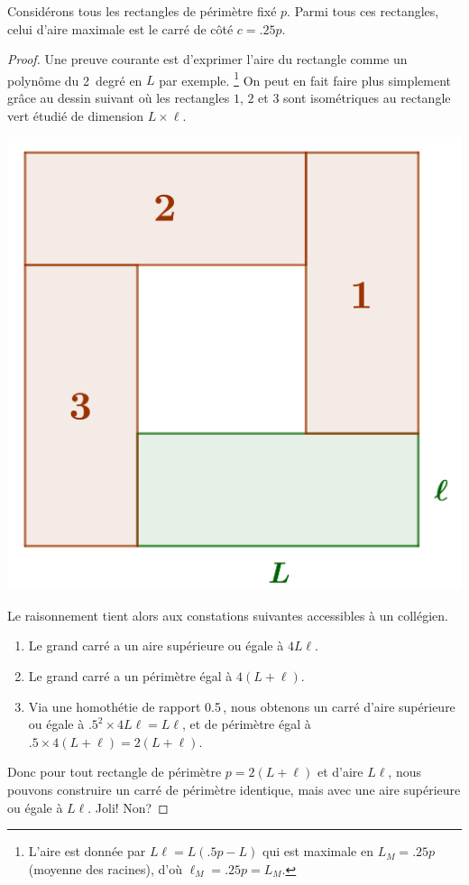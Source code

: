 \begin{fact} \label{iso-rect}
	Considérons tous les rectangles de périmètre fixé $p$. Parmi tous ces rectangles, celui d'aire maximale est le carré de côté $c = \num{.25} p$.
\end{fact}


\begin{proof}
	Une preuve courante est d'exprimer l'aire du rectangle comme un polynôme du 2\ieme\ degré en $L$ par exemple.%
	\footnote{
		L'aire est donnée par $L \ell = L (\num{.5} p - L)$ qui est maximale en $L_M = \num{.25} p$ (moyenne des racines), d'où $\ell_M = \num{.25} p = L_M$.
	}
	On peut en fait faire plus simplement grâce au dessin suivant où les rectangles $1$, $2$ et $3$ sont isométriques au rectangle vert étudié de dimension $L \times \ell$.

	\begin{center}
		\includegraphics[scale=.4]{content/rectangle/rectangle.png}
	\end{center}
	
	Le raisonnement tient alors aux constations suivantes accessibles à un collégien.
	\begin{enumerate}
		\item Le grand carré a un aire supérieure ou égale à $4 L \ell$.

		\item Le grand carré a un périmètre égal à $4 (L + \ell)$.

		\item Via une homothétie de rapport \num{.5}\,, nous obtenons un carré d'aire supérieure ou égale à $\num{.5}^2 \times 4 L \ell =  L \ell$, et de périmètre égal à $\num{.5} \times 4 (L + \ell) = 2 (L + \ell)$.
	\end{enumerate}
	
	Donc pour tout rectangle de périmètre $p = 2 (L + \ell)$ et d'aire $L \ell$, nous pouvons construire un carré de périmètre identique, mais avec une aire supérieure ou égale à  $L \ell$. Joli! Non?
\end{proof}



